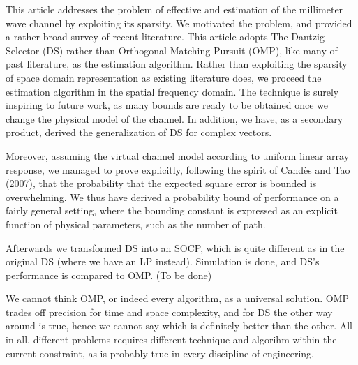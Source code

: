 
\startchapter [title={Conclusion}]

This article addresses the problem of effective and estimation of the millimeter wave channel by exploiting its sparsity.
We motivated the problem, and provided a rather broad survey of recent literature.
This article adopts The Dantzig Selector (DS) rather than Orthogonal Matching Pursuit (OMP), like many of past literature, as the estimation algorithm.
Rather than exploiting the sparsity of space domain representation as existing literature does, we proceed the estimation algorithm in the spatial frequency domain.
The technique is surely inspiring to future work, as many bounds are ready to be obtained once we change the physical model of the channel.
In addition, we have, as a secondary product, derived the generalization of DS for complex vectors.

Moreover, assuming the virtual channel model according to uniform linear array response, we managed to prove explicitly, following the spirit of Cand\`es and Tao (2007), that the probability that the expected square error is bounded is overwhelming.
We thus have derived a probability bound of performance on a fairly general setting, where the bounding constant is expressed as an explicit function of physical parameters, such as the number of path.

Afterwards we transformed DS into an SOCP, which is quite different as in the original DS (where we have an LP instead).
Simulation is done, and DS's performance is compared to OMP.
{ \color {red} (To be done) }

We cannot think OMP, or indeed every algorithm, as a universal solution.
OMP trades off precision for time and space complexity, and for DS the other way around is true, hence we cannot say which is definitely better than the other.
All in all, different problems requires different technique and algorihm within the current constraint, as is probably true in every discipline of engineering.

\stopchapter


